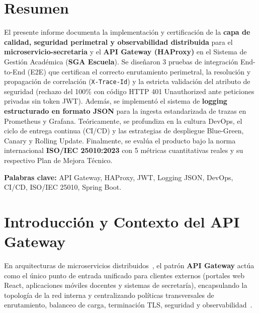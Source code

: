 \documentclass[11pt,a4paper]{article}
\begin{document}
\section*{Resumen}
El presente informe documenta la implementaci\'on y certificaci\'on de la \textbf{capa de calidad, seguridad perimetral y observabilidad distribuida} para el \textbf{microservicio-secretaria} y el \textbf{API Gateway (HAProxy)} en el Sistema de Gesti\'on Acad\'emica (\textbf{SGA Escuela}). Se dise\~naron 3 pruebas de integraci\'on End-to-End (E2E) que certifican el correcto enrutamiento perimetral, la resoluci\'on y propagaci\'on de correlaci\'on (\texttt{X-Trace-Id}) y la estricta validaci\'on del atributo de seguridad (rechazo del 100\% con c\'odigo HTTP 401 Unauthorized ante peticiones privadas sin token JWT). Adem\'as, se implement\'o el sistema de \textbf{logging estructurado en formato JSON} para la ingesta estandarizada de trazas en Prometheus y Grafana. Te\'oricamente, se profundiza en la cultura DevOps, el ciclo de entrega continua (CI/CD) y las estrategias de despliegue Blue-Green, Canary y Rolling Update. Finalmente, se eval\'ua el producto bajo la norma internacional \textbf{ISO/IEC 25010:2023} con 5 m\'etricas cuantitativas reales y su respectivo Plan de Mejora T\'ecnico.

\medskip
\noindent\textbf{Palabras clave:} API Gateway, HAProxy, JWT, Logging JSON, DevOps, CI/CD, ISO/IEC 25010, Spring Boot.

\vspace{0.4cm}

\section{Introducci\'on y Contexto del API Gateway}
En arquitecturas de microservicios distribuidos~\cite{newman2021microservices}, el patr\'on \textbf{API Gateway} act\'ua como el \'unico punto de entrada unificado para clientes externos (portales web React, aplicaciones m\'oviles docentes y sistemas de secretar\'ia), encapsulando la topolog\'ia de la red interna y centralizando pol\'iticas transversales de enrutamiento, balanceo de carga, terminaci\'on TLS, seguridad y observabilidad~\cite{burns2025designing}.
\end{document}

